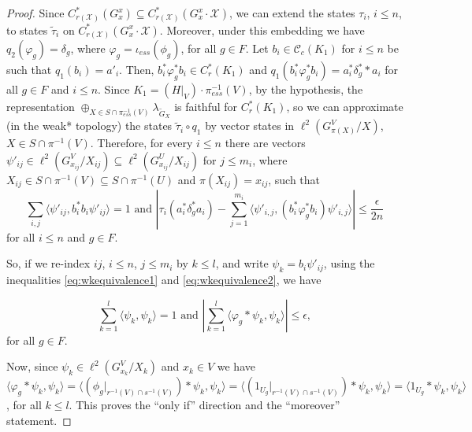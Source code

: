 \documentclass[10pt,a4paper]{amsart}
\begin{document}
\begin{proof}
Since $C^{*}_{r(\mathcal{X})}(G^{x}_{x})\subseteq C^{*}_{r(\mathcal{X})}(G^{x}_{x}\cdot\mathcal{X})$, we can extend the states $\tau_{i}$, $i\leq n$, to states $\tilde{\tau}_{i}$ on  $C^{*}_{r(\mathcal{X})}(G^{x}_{x}\cdot\mathcal{X})$. Moreover, under this embedding we have $q_{2}(\varphi_{g}) = \delta_{g}$, where $\varphi_{g} = \iota_{ess}(\phi_{g})$, for all $g\in F$. Let $b_{i}\in \mathscr{C}_{c}(K_{1})$ for $i\leq n$ be such that $q_{1}(b_{i}) = a'_{i}$. Then, $b^{*}_{i}\varphi^{*}_{g}b_{i}\in C^{*}_{r}(K_{1})$ and $q_{1}(b^{*}_{i}\varphi^{*}_{g}b_{i}) = a^{*}_{i}\delta^{*}_{g}*a_{i}$ for all $g\in F$ and $i\leq n$. Since $K_{1} = (H|_{V})\cdot \pi_{ess}^{-1}(V)$, by the hypothesis, the representation $\oplus_{X\in S\cap\pi_{ess}^{-1}(V)}\lambda_{\tilde{G}_{X}}$ is faithful for $C^{*}_{r}(K_{1})$, so we can approximate (in the weak* topology) the states $\tilde{\tau}_{i}\circ q_{1}$ by vector states in $\ell^{2}(G^{V}_{\pi(X)}/X)$, $X\in S\cap \pi^{-1}(V)$. Therefore, for every $i\leq n$ there are vectors $\psi'_{ij}\in \ell^{2}(G^{V}_{x_{ij}}/X_{ij})\subseteq \ell^{2}(G^{U}_{x_{ij}}/X_{ij})$ for $j\leq m_{i}$, where $X_{ij}\in S\cap\pi^{-1}(V)\subseteq S\cap \pi^{-1}(U)$ and $\pi(X_{ij}) = x_{ij}$, such that 
\begin{equation}
\label{eq:wkequivalence2}
    \sum_{i,j}\langle \psi'_{ij}, b_{i}^{*}b_{i}\psi'_{ij}\rangle = 1 \text{ and } |\tau_{i}(a^{*}_{i}\delta^{*}_{g}a_{i}) - \sum^{m_{i}}_{j=1}\langle \psi'_{i,j}, (b_{i}^{*}\varphi^{*}_{g}b_{i})\psi'_{i,j}\rangle|\leq \frac{\epsilon}{2n}
\end{equation}
for all $i\leq n$ and $g\in F$.

So, if we re-index $ij$, $i\leq n$, $j\leq m_{i}$ by $k\leq l$, and write $\psi_{k} = b_{i}\psi'_{ij}$, using the inequalities \ref{eq:wkequivalence1} and \ref{eq:wkequivalence2}, we have 

$$\sum^{l}_{k=1}\langle \psi_{k},\psi_{k}\rangle = 1 \text{ and } |\sum^{l}_{k=1}\langle \varphi_{g}*\psi_{k}, \psi_{k}\rangle |\leq \epsilon,$$
for all $g\in F$.

Now, since $\psi_{k}\in \ell^{2}(G^{V}_{x_{k}}/X_{k})$ and $x_{k}\in V$ we have  $\langle \varphi_{g}*\psi_{k}, \psi_{k}\rangle = \langle (\phi_{g}|_{r^{-1}(V)\cap s^{-1}(V)})*\psi_{k}, \psi_{k}\rangle = \langle (1_{U_{g}}|_{r^{-1}(V)\cap s^{-1}(V)})*\psi_{k}, \psi_{k}\rangle = \langle 1_{U_{g}}*\psi_{k}, \psi_{k}\rangle $, for all $k\leq l$. This proves the ``only if'' direction and the ``moreover'' statement.



\end{proof}
\end{document}
